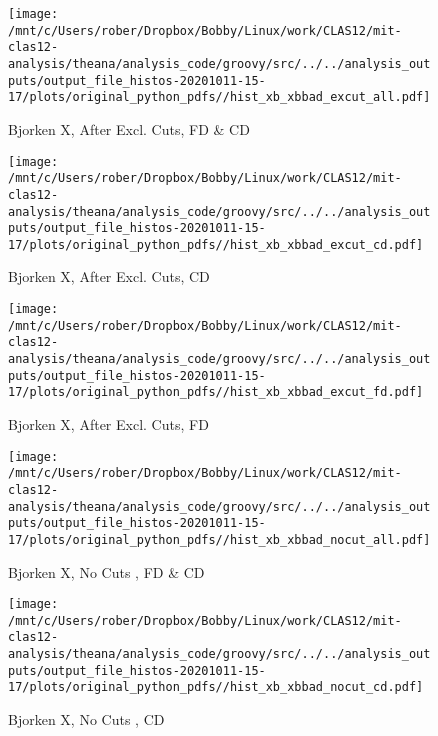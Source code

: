 \documentclass{article}
\begin{document}
\begin{landscape}
    \begin{figure}[h]
        \centering

        \texttt{[image: /mnt/c/Users/rober/Dropbox/Bobby/Linux/work/CLAS12/mit-clas12-analysis/theana/analysis\_code/groovy/src/../../analysis\_outputs/output\_file\_histos-20201011-15-17/plots/original\_python\_pdfs//hist\_xb\_xbbad\_excut\_all.pdf]}
        \captionsetup{textformat=empty,labelformat=blank}
        \caption{Bjorken X, After Excl. Cuts, FD \& CD}
    \end{figure}
    \clearpage
    
    \begin{figure}[h]
        \centering

        \texttt{[image: /mnt/c/Users/rober/Dropbox/Bobby/Linux/work/CLAS12/mit-clas12-analysis/theana/analysis\_code/groovy/src/../../analysis\_outputs/output\_file\_histos-20201011-15-17/plots/original\_python\_pdfs//hist\_xb\_xbbad\_excut\_cd.pdf]}
        \captionsetup{textformat=empty,labelformat=blank}
        \caption{Bjorken X, After Excl. Cuts, CD}
    \end{figure}
    \clearpage
    
    \begin{figure}[h]
        \centering

        \texttt{[image: /mnt/c/Users/rober/Dropbox/Bobby/Linux/work/CLAS12/mit-clas12-analysis/theana/analysis\_code/groovy/src/../../analysis\_outputs/output\_file\_histos-20201011-15-17/plots/original\_python\_pdfs//hist\_xb\_xbbad\_excut\_fd.pdf]}
        \captionsetup{textformat=empty,labelformat=blank}
        \caption{Bjorken X, After Excl. Cuts, FD}
    \end{figure}
    \clearpage
    
    \begin{figure}[h]
        \centering

        \texttt{[image: /mnt/c/Users/rober/Dropbox/Bobby/Linux/work/CLAS12/mit-clas12-analysis/theana/analysis\_code/groovy/src/../../analysis\_outputs/output\_file\_histos-20201011-15-17/plots/original\_python\_pdfs//hist\_xb\_xbbad\_nocut\_all.pdf]}
        \captionsetup{textformat=empty,labelformat=blank}
        \caption{Bjorken X, No Cuts , FD \& CD}
    \end{figure}
    \clearpage
    
    \begin{figure}[h]
        \centering

        \texttt{[image: /mnt/c/Users/rober/Dropbox/Bobby/Linux/work/CLAS12/mit-clas12-analysis/theana/analysis\_code/groovy/src/../../analysis\_outputs/output\_file\_histos-20201011-15-17/plots/original\_python\_pdfs//hist\_xb\_xbbad\_nocut\_cd.pdf]}
        \captionsetup{textformat=empty,labelformat=blank}
        \caption{Bjorken X, No Cuts , CD}
    \end{figure}
    \clearpage
    

\end{landscape}
\end{document}
